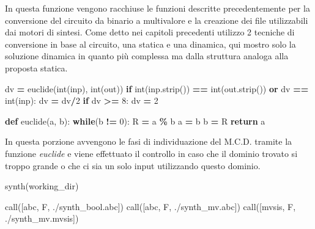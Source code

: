 \documentclass[
  italian,
]{book}
\newenvironment{Shaded}{\begin{snugshade}}{\end{snugshade}}
\newcommand{\BuiltInTok}[1]{#1}
\newcommand{\ControlFlowTok}[1]{\textcolor[rgb]{0.13,0.29,0.53}{\textbf{#1}}}
\newcommand{\DecValTok}[1]{\textcolor[rgb]{0.00,0.00,0.81}{#1}}
\newcommand{\KeywordTok}[1]{\textcolor[rgb]{0.13,0.29,0.53}{\textbf{#1}}}
\newcommand{\NormalTok}[1]{#1}
\newcommand{\OperatorTok}[1]{\textcolor[rgb]{0.81,0.36,0.00}{\textbf{#1}}}
\newcommand{\StringTok}[1]{\textcolor[rgb]{0.31,0.60,0.02}{#1}}
\begin{document}
In questa funzione vengono racchiuse le funzioni descritte precedentemente per la conversione del circuito da binario a multivalore e la creazione dei file utilizzabili dai motori di sintesi. Come detto nei capitoli precedenti utilizzo 2 tecniche di conversione in base al circuito, una statica e una dinamica, qui mostro solo la soluzione dinamica in quanto più complessa ma dalla struttura analoga alla proposta statica.

\newpage

\begin{Shaded}
\begin{Highlighting}[]
\NormalTok{dv }\OperatorTok{=}\NormalTok{ euclide(}\BuiltInTok{int}\NormalTok{(inp), }\BuiltInTok{int}\NormalTok{(out))}
  \ControlFlowTok{if} \BuiltInTok{int}\NormalTok{(inp.strip()) }\OperatorTok{==} \BuiltInTok{int}\NormalTok{(out.strip())}
    \KeywordTok{or}\NormalTok{ dv }\OperatorTok{==} \BuiltInTok{int}\NormalTok{(inp):}
\NormalTok{    dv }\OperatorTok{=}\NormalTok{ dv}\OperatorTok{/}\DecValTok{2}
  \ControlFlowTok{if}\NormalTok{ dv }\OperatorTok{\textgreater{}=} \DecValTok{8}\NormalTok{:}
\NormalTok{    dv }\OperatorTok{=} \DecValTok{2} 

\KeywordTok{def}\NormalTok{ euclide(a, b):}
  \ControlFlowTok{while}\NormalTok{(b }\OperatorTok{!=} \DecValTok{0}\NormalTok{):}
\NormalTok{    R }\OperatorTok{=}\NormalTok{ a }\OperatorTok{\%}\NormalTok{ b}
\NormalTok{    a }\OperatorTok{=}\NormalTok{ b}
\NormalTok{    b }\OperatorTok{=}\NormalTok{ R}
  \ControlFlowTok{return}\NormalTok{ a}
\end{Highlighting}
\end{Shaded}

In questa porzione avvengono le fasi di individuazione del M.C.D. tramite la funzione \emph{euclide} e viene effettuato il controllo in caso che il dominio trovato si troppo grande o che ci sia un solo input utilizzando questo dominio.

\begin{Shaded}
\begin{Highlighting}[]
\NormalTok{synth(working\_dir)}

\NormalTok{call([}\StringTok{\textquotesingle{}abc\textquotesingle{}}\NormalTok{, }\StringTok{\textquotesingle{}{-}F\textquotesingle{}}\NormalTok{, }\StringTok{\textquotesingle{}./synth\_bool.abc\textquotesingle{}}\NormalTok{])}
\NormalTok{call([}\StringTok{\textquotesingle{}abc\textquotesingle{}}\NormalTok{, }\StringTok{\textquotesingle{}{-}F\textquotesingle{}}\NormalTok{, }\StringTok{\textquotesingle{}./synth\_mv.abc\textquotesingle{}}\NormalTok{])}
\NormalTok{call([}\StringTok{\textquotesingle{}mvsis\textquotesingle{}}\NormalTok{, }\StringTok{\textquotesingle{}{-}F\textquotesingle{}}\NormalTok{, }\StringTok{\textquotesingle{}./synth\_mv.mvsis\textquotesingle{}}\NormalTok{])}
\end{Highlighting}
\end{Shaded}
\end{document}
